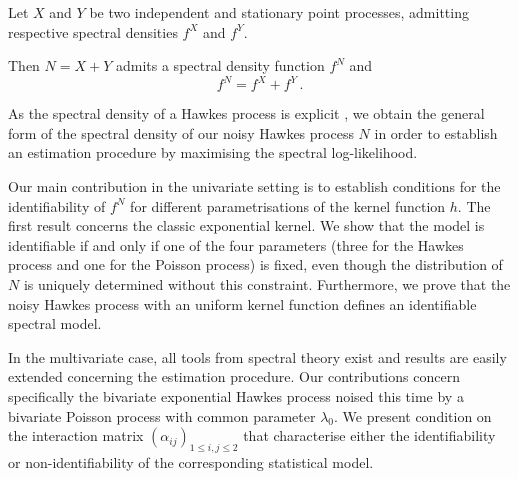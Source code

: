     \begin{proposition}\label{prop:chap0_sum_of_spectral_densities}
      Let $X$ and $Y$ be two independent and stationary point processes, admitting respective spectral densities ${f}^X$ and ${f}^Y$.
      
      Then $N = X + Y$ admits a spectral density function $f^N$ and
      \begin{equation} \label{eq:chap0_sum_spectral_densities}
        {f}^N = {f}^X + {f}^Y\,.
      \end{equation}
    \end{proposition}
    As the spectral density of a Hawkes process is explicit \parencite[Example 8.2(e)]{DaleyV1}, we obtain the general form of the spectral density of our noisy Hawkes process $N$ in order to establish an estimation procedure by maximising the spectral log-likelihood.

    
    Our main contribution in the univariate setting is to establish conditions for the identifiability of $f^N$ for different parametrisations of the kernel function $h$. 
    The first result concerns the classic exponential kernel. 
    We show that the model is identifiable if and only if one of the four parameters (three for the Hawkes process and one for the Poisson process) is fixed, even though the distribution of $N$ is uniquely determined without this constraint.
    Furthermore, we prove that the noisy Hawkes process with an uniform kernel function defines an identifiable spectral model.

    In the multivariate case, all tools from spectral theory exist and results are easily extended concerning the estimation procedure.
    Our contributions concern specifically the bivariate exponential Hawkes process noised this time by a bivariate Poisson process with common parameter $\lambda_0$.
    We present condition on the interaction matrix $(\alpha_{ij})_{1 \leq i,j \leq 2}$ that characterise either the identifiability or non-identifiability of the corresponding statistical model.

